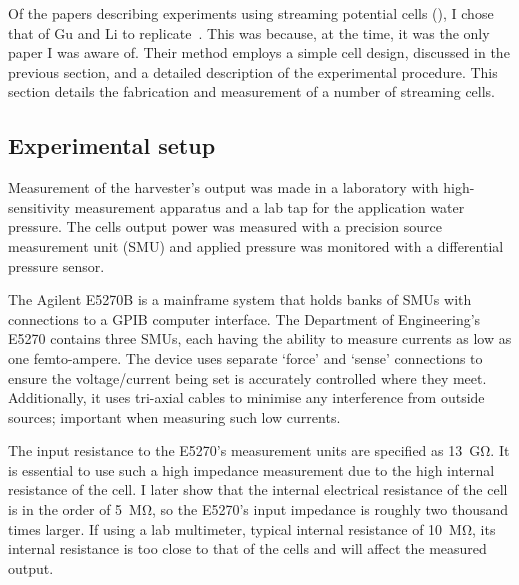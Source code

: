   Of the papers describing experiments using streaming potential cells (\cite{Gu2000,Mala1997,Scales1992,VanderHeyden2006}), I chose that of Gu and Li to replicate~\cite{Gu2000}.
  This was because, at the time, it was the only paper I was aware of.
  Their method employs a simple cell design, discussed in the previous section, and a detailed description of the experimental procedure.
  This section details the fabrication and measurement of a number of streaming cells.


  \subsection{Experimental setup}
    \label{sub:part1_energyHarvesting_measuringStreamingCells_experimentalSetup}


    Measurement of the harvester's output was made in a laboratory with high-sensitivity measurement apparatus and a lab tap for the application water pressure.
    The cells output power was measured with a precision source measurement unit (SMU) and applied pressure was monitored with a differential pressure sensor.

    The Agilent E5270B is a mainframe system that holds banks of SMUs with connections to a GPIB computer interface.
    The Department of Engineering's E5270 contains three SMUs, each having the ability to measure currents as low as one femto-ampere.
    The device uses separate `force' and `sense' connections to ensure the voltage/current being set is accurately controlled where they meet.
    Additionally, it uses tri-axial cables to minimise any interference from outside sources; important when measuring such low currents.

    The input resistance to the E5270's measurement units are specified as \SI{13}{\giga\ohm}.
    It is essential to use such a high impedance measurement due to the high internal resistance of the cell.
    I later show that the internal electrical resistance of the cell is in the order of \SI{5}{\mega\ohm}, so the E5270's input impedance is roughly two thousand times larger.
    If using a lab multimeter, typical internal resistance of \SI{10}{\mega\ohm}, its internal resistance is too close to that of the cells and will affect the measured output.

